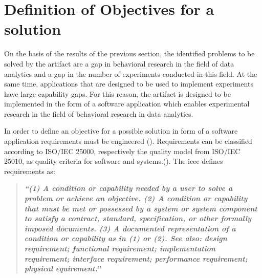 \section{Definition of Objectives for a solution}\label{sec:objectForSolution}

On the basis of the results of the previous section, the identified problems to be solved by the artifact are a gap in behavioral research in the field of data analytics and a gap in the number of experiments conducted in this field. At the same time, applications that are designed to be used to implement experiments have large capability gaps. For this reason, the artifact is designed to be implemented in the form of a software application which enables experimental research in the field of behavioral research in data analytics.

In order to define an objective for a possible solution in form of a software application requirements must be engineered (\cite{Seacord.2003}). Requirements can be classified according to ISO/IEC 25000, respectively the quality model from ISO/IEC 25010, as quality criteria for software and systems.(\cite{ISOIEC25010.2011}). The \ac{ieee} defines requirements as:
\begin{quote}
    \textbf{\textit{\enquote{(1) A condition or capability needed by a user to solve a problem or achieve an objective. (2) A condition or capability that must be met or possessed by a system or system component to satisfy a contract, standard, specification, or other formally imposed documents. (3) A documented representation of a condition or capability as in (1) or (2). See also: design requirement; functional requirement; implementation requirement; interface requirement; performance requirement; physical equirement.}}} \cite{IEEE.1990}
\end{quote}  
